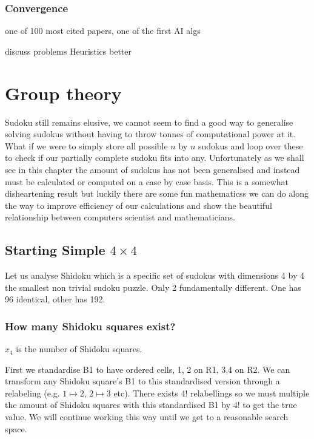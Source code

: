 \documentclass[a4paper,11pt]{report}
\newcounter{row}
\begin{document}
\subsection{Convergence}
\cite{simulatedannealing} one of 100 most cited papers, one of the first AI algs

discuss problems 
Heuristics better



\chapter{Group theory}

Sudoku still remains elusive, we cannot seem to find a good way to generalise solving sudokus without having to throw tonnes of computational power at it. What if we were to simply store all possible $n$ by $n$ sudokus and loop over these to check if our partially complete sudoku fits into any. Unfortunately as we shall see in this chapter the amount of sudokus has not been generalised and instead must be calculated or computed on a case by case basis. This is a somewhat disheartening result but luckily there are some fun mathematicss we can do along the way to improve efficiency of our calculations and show the beautiful relationship between computers scientist and mathematicians.

\section{Starting Simple $4 \times 4$}
Let us analyse Shidoku which is a specific set of sudokus with dimensions 4 by 4 the smallest non trivial sudoku puzzle. Only 2 fundamentally different. One has 96 identical, other has 192. 

\subsection{How many Shidoku squares exist?}

$x_4$ is the number of Shidoku squares.

First we standardise B1 to have ordered cells, 1, 2 on R1, 3,4 on R2. We can transform any Shidoku square's B1 to this standardised version through a relabeling (e.g. $1 \mapsto 2$, $2\mapsto 3$ etc). There exists 4! relabellings so we must multiple the amount of Shidoku squares with this standardised B1 by 4! to get the true value. We will continue working this way until we get to a reasonable search space.
\end{document}
